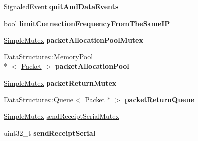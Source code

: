 \begin{DoxyCompactItemize}
\item 
\hypertarget{class_rak_net_1_1_rak_peer_a6e7482a161f17b8b311e8ee3fde3f5ce}{\hyperlink{class_rak_net_1_1_signaled_event}{Signaled\-Event} {\bfseries quit\-And\-Data\-Events}}\label{class_rak_net_1_1_rak_peer_a6e7482a161f17b8b311e8ee3fde3f5ce}

\item 
\hypertarget{class_rak_net_1_1_rak_peer_a24c43f0119058c45fbec17aa2f9ba98e}{bool {\bfseries limit\-Connection\-Frequency\-From\-The\-Same\-I\-P}}\label{class_rak_net_1_1_rak_peer_a24c43f0119058c45fbec17aa2f9ba98e}

\item 
\hypertarget{class_rak_net_1_1_rak_peer_a7a081db9528cf82e18d1199ae82b79ae}{\hyperlink{class_rak_net_1_1_simple_mutex}{Simple\-Mutex} {\bfseries packet\-Allocation\-Pool\-Mutex}}\label{class_rak_net_1_1_rak_peer_a7a081db9528cf82e18d1199ae82b79ae}

\item 
\hypertarget{class_rak_net_1_1_rak_peer_ae0b2187eec74db93572e7110c1f1455e}{\hyperlink{class_data_structures_1_1_memory_pool}{Data\-Structures\-::\-Memory\-Pool}\\*
$<$ \hyperlink{struct_rak_net_1_1_packet}{Packet} $>$ {\bfseries packet\-Allocation\-Pool}}\label{class_rak_net_1_1_rak_peer_ae0b2187eec74db93572e7110c1f1455e}

\item 
\hypertarget{class_rak_net_1_1_rak_peer_a864a7df112cfbe35e6b5fc9158df0302}{\hyperlink{class_rak_net_1_1_simple_mutex}{Simple\-Mutex} {\bfseries packet\-Return\-Mutex}}\label{class_rak_net_1_1_rak_peer_a864a7df112cfbe35e6b5fc9158df0302}

\item 
\hypertarget{class_rak_net_1_1_rak_peer_abc3ed03b2f4e53b6f632f3c4a9ed07db}{\hyperlink{class_data_structures_1_1_queue}{Data\-Structures\-::\-Queue}$<$ \hyperlink{struct_rak_net_1_1_packet}{Packet} $\ast$ $>$ {\bfseries packet\-Return\-Queue}}\label{class_rak_net_1_1_rak_peer_abc3ed03b2f4e53b6f632f3c4a9ed07db}

\item 
\hyperlink{class_rak_net_1_1_simple_mutex}{Simple\-Mutex} \hyperlink{class_rak_net_1_1_rak_peer_aa4972e4a0c0573671148f33ca2c9ebd6}{send\-Receipt\-Serial\-Mutex}
\item 
\hypertarget{class_rak_net_1_1_rak_peer_a4ffee1f7097c7f4f7438abaeef043983}{uint32\-\_\-t {\bfseries send\-Receipt\-Serial}}\label{class_rak_net_1_1_rak_peer_a4ffee1f7097c7f4f7438abaeef043983}

\end{DoxyCompactItemize}
